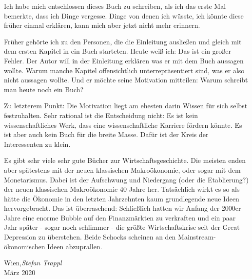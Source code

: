 %
%
%

\preface

Ich habe mich entschlossen dieses Buch zu schreiben, als ich das erste Mal bemerkte, dass ich Dinge vergesse. Dinge von denen ich wüsste, ich könnte diese früher einmal erklären, kann mich aber jetzt nicht mehr erinnern.

Früher gehörte ich zu den Personen, die die Einleitung ausließen und gleich mit dem ersten Kapitel in ein Buch starteten. Heute weiß ich: Das ist ein großer Fehler. Der Autor will in der Einleitung erklären was er mit dem Buch aussagen wollte. Warum manche Kapitel offensichtlich unterrepräsentiert sind, was er also nicht aussagen wollte. Und er möchte seine Motivation mitteilen: Warum schreibt man heute noch ein Buch?

Zu letzterem Punkt: Die Motivation liegt am ehesten darin Wissen für sich selbst festzuhalten. Sehr rational ist die Entscheidung nicht: Es ist kein wissenschaftliches Werk, dass eine wissenschaftliche Karriere fördern könnte. Es ist aber auch kein Buch für die breite Masse. Dafür ist der Kreis der Interessenten zu klein.

Es gibt sehr viele sehr gute Bücher zur Wirtschaftsgeschichte. Die meisten enden aber spätestens mit der neuen klassischen Makroökonomie, oder sogar mit dem Monetarismus. Dabei ist der Aufschwung und Niedergang (oder die Etablierung?) der neuen klassischen Makroökonomie 40 Jahre her. Tatsächlich wirkt es so als hätte die Ökonomie in den letzten Jahrzehnten kaum grundlegende neue Ideen hervorgebracht. Das ist überraschend: Schließlich hatten wir Anfang der 2000er Jahre eine enorme Bubble auf den Finanzmärkten zu verkraften und ein paar Jahr später - sogar noch schlimmer - die größte Wirtschaftskrise seit der Great Depression zu überstehen. Beide Schocks scheinen an den Mainstream-ökonomischen Ideen abzuprallen.


\vspace{1cm}
\begin{flushright}\noindent
Wien,\hfill {\it Stefan Trappl}\\
März 2020\hfill
\end{flushright}


